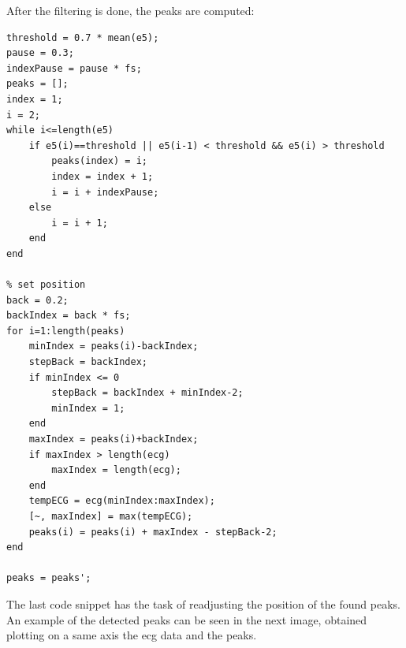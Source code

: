 \documentclass[a4paper,titlepage]{article}
\begin{document}
After the filtering is done, the peaks are computed:

\begin {lstlisting}[caption=Peak detection]
threshold = 0.7 * mean(e5);
pause = 0.3;
indexPause = pause * fs;
peaks = [];
index = 1;
i = 2;
while i<=length(e5)
	if e5(i)==threshold || e5(i-1) < threshold && e5(i) > threshold
		peaks(index) = i;
		index = index + 1;
		i = i + indexPause;
	else
		i = i + 1;
	end
end

back = 0.2;
backIndex = back * fs;
for i=1:length(peaks)
	minIndex = peaks(i)-backIndex;
	stepBack = backIndex;
	if minIndex <= 0
		stepBack = backIndex + minIndex-2;
		minIndex = 1;
	end
	maxIndex = peaks(i)+backIndex;
	if maxIndex > length(ecg)
		maxIndex = length(ecg);
	end
	tempECG = ecg(minIndex:maxIndex);
	[~, maxIndex] = max(tempECG);
	peaks(i) = peaks(i) + maxIndex - stepBack-2;
end

peaks = peaks';

\end{lstlisting}

The last code snippet has the task of readjusting the position of the found peaks. An example of the detected peaks can be seen in the next image, obtained plotting on a same axis the ecg data and the peaks.

\begin{figure}[h!]

\hspace*{-\dimexpr\oddsidemargin+1in\relax}\hspace*{-\paperwidth}
\end{figure}
\end{document}
